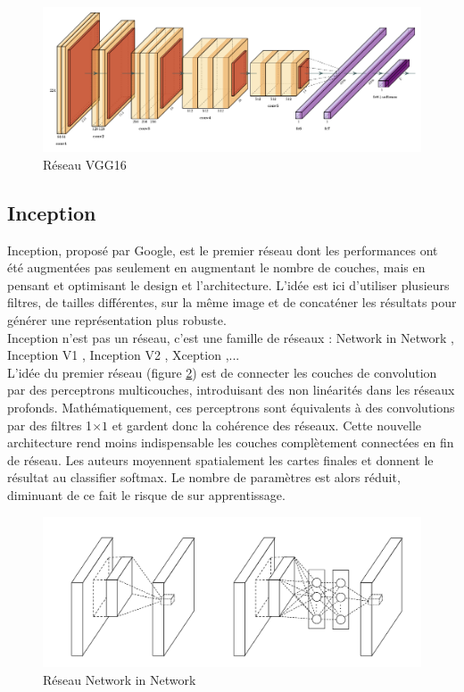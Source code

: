 \documentclass{DocBleu}
\begin{document}
\begin{figure}
\includegraphics[width=\textwidth]{images/VGG16}
\caption{Réseau VGG16}
\label{F:vgg16}
\end{figure}


\subsection{Inception}
Inception, proposé par Google, est le premier réseau dont les performances ont été augmentées pas seulement en augmentant le nombre de couches, mais en pensant et optimisant le design et l'architecture. L'idée est ici d'utiliser plusieurs filtres, de tailles différentes, sur la même image  et de concaténer les résultats pour générer une représentation plus robuste. \\
Inception n'est pas un réseau, c'est une famille de réseaux :  Network in Network \cite{Lin13}, Inception V1 \cite{Szegedy14}, Inception V2 \cite{Szegedy15}, Xception \cite{Chollet16},...\\
L'idée du premier réseau (figure \ref{F:NIN}) est de connecter  les couches de convolution par des perceptrons multicouches, introduisant des non linéarités dans les réseaux profonds. Mathématiquement, ces perceptrons sont  équivalents à des convolutions par des filtres 1$\times 1$ et gardent donc la cohérence des réseaux. Cette nouvelle architecture rend moins indispensable les couches complètement connectées en fin de réseau. Les auteurs moyennent spatialement les cartes finales et donnent le résultat au classifier softmax. Le nombre de paramètres est alors réduit, diminuant de ce fait le risque de sur apprentissage. 

\begin{figure}[hbtp!]
\centering
\includegraphics[scale=.6]{images/NIN.png}
\caption{Réseau Network in Network}
\label{F:NIN}
\end{figure}
\end{document}
